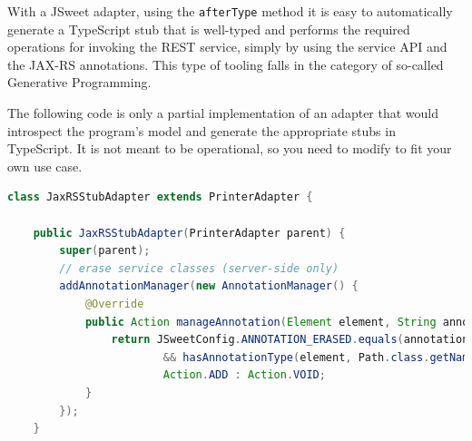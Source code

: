 \documentclass[a4paper]{report}
\begin{document}
With a JSweet adapter, using the \texttt{afterType} method it is easy to automatically generate a TypeScript stub that is well-typed and performs the required operations for invoking the REST service, simply by using the service API and the JAX-RS annotations. This type of tooling falls in the category of so-called Generative Programming. 

The following code is only a partial implementation of an adapter that would introspect the program's model and generate the appropriate stubs in TypeScript. It is not meant to be operational, so you need to modify to fit your own use case.

\begin{lstlisting}[language=Java]
class JaxRSStubAdapter extends PrinterAdapter {

	public JaxRSStubAdapter(PrinterAdapter parent) {
		super(parent);
		// erase service classes (server-side only)
		addAnnotationManager(new AnnotationManager() {
			@Override
			public Action manageAnnotation(Element element, String annotationType) {
				return JSweetConfig.ANNOTATION_ERASED.equals(annotationType)
						&& hasAnnotationType(element, Path.class.getName()) ? 
						Action.ADD : Action.VOID;
			}
		});
	}


\end{lstlisting}
\end{document}
